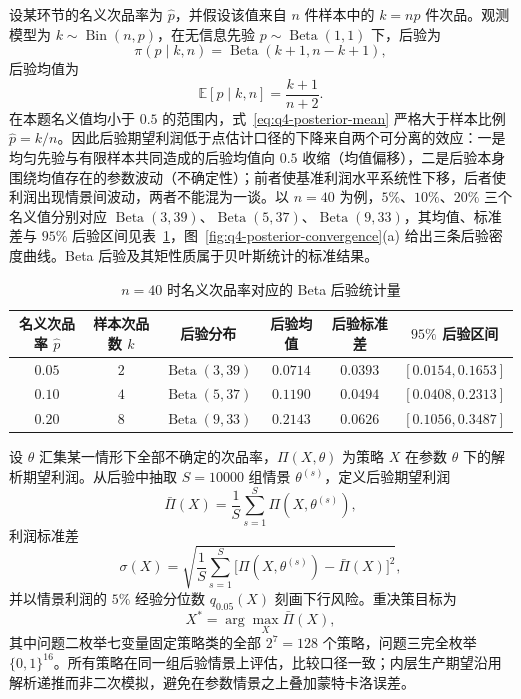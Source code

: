 设某环节的名义次品率为 $\hat p$，并假设该值来自 $n$ 件样本中的 $k=n\hat p$ 件次品。观测模型为 $k\sim\operatorname{Bin}(n,p)$，在无信息先验 $p\sim\operatorname{Beta}(1,1)$ 下，后验为
\begin{equation}
  \pi(p\mid k,n)=\operatorname{Beta}(k+1,n-k+1),
  \label{eq:q4-posterior}
\end{equation}
后验均值为
\begin{equation}
  \mathbb{E}[p\mid k,n]=\frac{k+1}{n+2}.
  \label{eq:q4-posterior-mean}
\end{equation}
在本题名义值均小于 $0.5$ 的范围内，式~\eqref{eq:q4-posterior-mean} 严格大于样本比例 $\hat p=k/n$。因此后验期望利润低于点估计口径的下降来自两个可分离的效应：一是均匀先验与有限样本共同造成的后验均值向 $0.5$ 收缩（均值偏移），二是后验本身围绕均值存在的参数波动（不确定性）；前者使基准利润水平系统性下移，后者使利润出现情景间波动，两者不能混为一谈。以 $n=40$ 为例，$5\%$、$10\%$、$20\%$ 三个名义值分别对应 $\operatorname{Beta}(3,39)$、$\operatorname{Beta}(5,37)$、$\operatorname{Beta}(9,33)$，其均值、标准差与 $95\%$ 后验区间见表~\ref{tab:q4-posterior}，图~\ref{fig:q4-posterior-convergence}(a) 给出三条后验密度曲线。Beta 后验及其矩性质属于贝叶斯统计的标准结果\cite{bayes-gelman,stat-casella}。

\begin{table}[H]
  \centering
  \caption{$n=40$ 时名义次品率对应的 Beta 后验统计量}
  \label{tab:q4-posterior}
  \begin{tabular}{cccccc}
    \toprule
    名义次品率 $\hat p$ & 样本次品数 $k$ & 后验分布 & 后验均值 & 后验标准差 & $95\%$ 后验区间 \\
    \midrule
    $0.05$ & $2$ & $\operatorname{Beta}(3,39)$ & $0.0714$ & $0.0393$ & $[0.0154,0.1653]$ \\
    $0.10$ & $4$ & $\operatorname{Beta}(5,37)$ & $0.1190$ & $0.0494$ & $[0.0408,0.2313]$ \\
    $0.20$ & $8$ & $\operatorname{Beta}(9,33)$ & $0.2143$ & $0.0626$ & $[0.1056,0.3487]$ \\
    \bottomrule
  \end{tabular}
\end{table}

设 $\theta$ 汇集某一情形下全部不确定的次品率，$\Pi(X,\theta)$ 为策略 $X$ 在参数 $\theta$ 下的解析期望利润。从后验中抽取 $S=10000$ 组情景 $\theta^{(s)}$，定义后验期望利润
\begin{equation}
  \bar\Pi(X)=\frac{1}{S}\sum_{s=1}^{S}\Pi(X,\theta^{(s)}),
  \label{eq:q4-expected-profit}
\end{equation}
利润标准差
\begin{equation}
  \sigma(X)=\sqrt{\frac{1}{S}\sum_{s=1}^{S}\bigl[\Pi(X,\theta^{(s)})-\bar\Pi(X)\bigr]^2},
  \label{eq:q4-profit-sd}
\end{equation}
并以情景利润的 $5\%$ 经验分位数 $q_{0.05}(X)$ 刻画下行风险。重决策目标为
\begin{equation}
  X^\ast=\arg\max_{X}\bar\Pi(X),
  \label{eq:q4-objective}
\end{equation}
其中问题二枚举七变量固定策略类的全部 $2^7=128$ 个策略，问题三完全枚举 $\{0,1\}^{16}$。所有策略在同一组后验情景上评估，比较口径一致；内层生产期望沿用解析递推而非二次模拟，避免在参数情景之上叠加蒙特卡洛误差。

